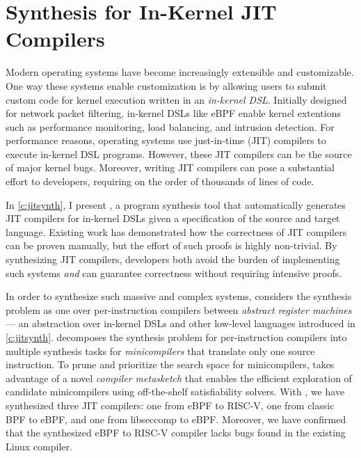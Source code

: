 \section{Synthesis for In-Kernel JIT Compilers}
Modern operating systems have become increasingly extensible and customizable.
One way these systems enable customization is by
allowing users to submit custom code for kernel execution
written in an \textit{in-kernel DSL}.
Initially designed for network packet filtering, 
in-kernel DSLs like eBPF  enable kernel extentions
such as performance monitoring, load balancing, and intrusion detection.
For performance reasons, operating systems use just-in-time (JIT) compilers
to execute in-kernel DSL programs.
However,
these JIT compilers can be the source of major kernel bugs.
Moreover, writing JIT compilers can pose a substantial effort to developers,
requiring on the order of thousands of lines of code.

In \cref{c:jitsynth}, I present \jitsynth, a program synthesis tool that
automatically generates JIT compilers for in-kernel DSLs
given a specification of the source and target language.
Existing work has demonstrated how the correctness of JIT compilers
can be proven manually,
but the effort of such proofs is highly non-trivial.
By synthesizing JIT compilers, developers both avoid the burden of implementing
such systems \textit{and} can guarantee correctness
without requiring intensive proofs.

In order to synthesize such massive and complex systems,
\jitsynth considers the synthesis problem as one over per-instruction compilers
between \textit{abstract register machines} --- an abstraction over
in-kernel DSLs and other low-level languages introduced in \cref{c:jitsynth}.
\jitsynth decomposes the synthesis problem for per-instruction compilers
into multiple synthesis tasks for \textit{minicompilers}
that translate only one source instruction.%
To prune and prioritize the search space for minicompilers,
\jitsynth takes advantage of a novel \textit{compiler metasketch}
that enables the efficient exploration of candidate minicompilers
using off-the-shelf satisfiability solvers.
With \jitsynth, we have synthesized three JIT compilers:
one from eBPF to RISC-V,
one from classic BPF to eBPF,
and one from libseccomp to eBPF.
Moreover, we have confirmed that the synthesized eBPF to RISC-V compiler
lacks bugs found in the existing Linux compiler.

